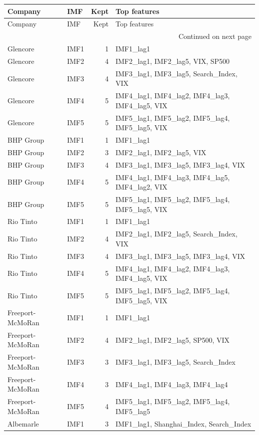 \begin{longtable}{llrp{8.5cm}}
\toprule
Company & IMF & Kept & Top features \\
\midrule
\endfirsthead
\toprule
Company & IMF & Kept & Top features \\
\midrule
\endhead
\midrule
\multicolumn{4}{r}{Continued on next page} \\
\midrule
\endfoot
\bottomrule
\endlastfoot
Glencore & IMF1 & 1 & IMF1\_lag1 \\
Glencore & IMF2 & 4 & IMF2\_lag1, IMF2\_lag5, VIX, SP500 \\
Glencore & IMF3 & 4 & IMF3\_lag1, IMF3\_lag5, Search\_Index, VIX \\
Glencore & IMF4 & 5 & IMF4\_lag1, IMF4\_lag2, IMF4\_lag3, IMF4\_lag5, VIX \\
Glencore & IMF5 & 5 & IMF5\_lag1, IMF5\_lag2, IMF5\_lag4, IMF5\_lag5, VIX \\
BHP Group & IMF1 & 1 & IMF1\_lag1 \\
BHP Group & IMF2 & 3 & IMF2\_lag1, IMF2\_lag5, VIX \\
BHP Group & IMF3 & 4 & IMF3\_lag1, IMF3\_lag5, IMF3\_lag4, VIX \\
BHP Group & IMF4 & 5 & IMF4\_lag1, IMF4\_lag3, IMF4\_lag5, IMF4\_lag2, VIX \\
BHP Group & IMF5 & 5 & IMF5\_lag1, IMF5\_lag2, IMF5\_lag4, IMF5\_lag5, VIX \\
Rio Tinto & IMF1 & 1 & IMF1\_lag1 \\
Rio Tinto & IMF2 & 4 & IMF2\_lag1, IMF2\_lag5, Search\_Index, VIX \\
Rio Tinto & IMF3 & 4 & IMF3\_lag1, IMF3\_lag5, IMF3\_lag4, VIX \\
Rio Tinto & IMF4 & 5 & IMF4\_lag1, IMF4\_lag2, IMF4\_lag3, IMF4\_lag5, VIX \\
Rio Tinto & IMF5 & 5 & IMF5\_lag1, IMF5\_lag2, IMF5\_lag4, IMF5\_lag5, VIX \\
Freeport-McMoRan & IMF1 & 1 & IMF1\_lag1 \\
Freeport-McMoRan & IMF2 & 4 & IMF2\_lag1, IMF2\_lag5, SP500, VIX \\
Freeport-McMoRan & IMF3 & 3 & IMF3\_lag1, IMF3\_lag5, Search\_Index \\
Freeport-McMoRan & IMF4 & 3 & IMF4\_lag1, IMF4\_lag3, IMF4\_lag4 \\
Freeport-McMoRan & IMF5 & 4 & IMF5\_lag1, IMF5\_lag2, IMF5\_lag4, IMF5\_lag5 \\
Albemarle & IMF1 & 3 & IMF1\_lag1, Shanghai\_Index, Search\_Index \\

\end{longtable}
